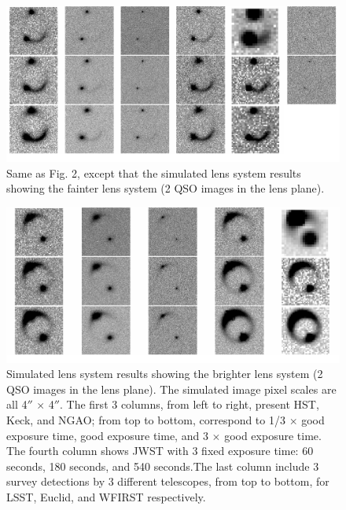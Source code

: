 \documentclass[a4paper,11pt]{article}
\begin{document}
\begin{figure}
\begin{center}
\includegraphics[width=1.0\textwidth]{fainter_system_2QSOimages_all.png}
\end{center}
\caption{Same as Fig. 2, except that the simulated lens system results showing the fainter lens system (2 QSO images in the lens plane).}
\label{fig:fainter_2QSOimages_montage}
\end{figure}


\begin{figure}
\begin{center}
\includegraphics[width=1.0\textwidth]{brighter_system_2QSOimages_all.png}
\end{center}
\caption{Simulated lens system results showing the brighter lens system (2 QSO images in the lens plane). The simulated image pixel scales are all 4$''$ $\times$ 4$''$. The first 3 columns, from left to right, present HST, Keck, and NGAO; from top to bottom, correspond to 1/3 $\times$ good exposure time, good exposure time, and 3 $\times$ good exposure time. The fourth column shows JWST with 3 fixed exposure time: 60 seconds, 180 seconds, and 540 seconds.The last column include 3 survey detections by 3 different telescopes, from top to bottom, for LSST, Euclid, and WFIRST respectively.}
\label{fig:brighter_2QSOimages_montage}
\end{figure}
\end{document}
